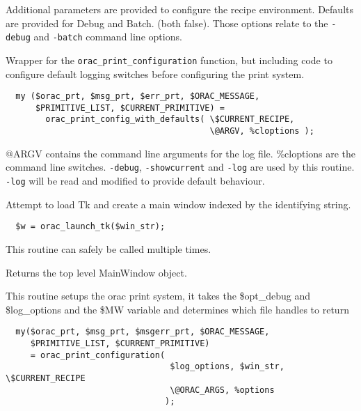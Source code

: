\begin{description}
Additional parameters are provided to configure the recipe
environment. Defaults are provided for Debug and Batch.
(both false). Those options relate to the \texttt{-debug} and \texttt{-batch}
command line options.


\item[{\textbf{orac\_print\_config\_with\_defaults}}] \mbox{}

Wrapper for the \texttt{orac\_print\_configuration} function, but including
code to configure default logging switches before configuring the
print system.

\begin{verbatim}
  my ($orac_prt, $msg_prt, $err_prt, $ORAC_MESSAGE,
      $PRIMITIVE_LIST, $CURRENT_PRIMITIVE) =
        orac_print_config_with_defaults( \$CURRENT_RECIPE,
                                         \@ARGV, %cloptions );
\end{verbatim}


@ARGV contains the command line arguments for the log file. \%cloptions
are the command line switches. \texttt{-debug}, \texttt{-showcurrent} and \texttt{-log}
are used by this routine. \texttt{-log} will be read and modified to provide
default behaviour.


\item[{\textbf{orac\_launch\_tk}}] \mbox{}

Attempt to load Tk and create a main window indexed by the identifying
string.

\begin{verbatim}
  $w = orac_launch_tk($win_str);
\end{verbatim}


This routine can safely be called multiple times.



Returns the top level MainWindow object.


\item[{\textbf{orac\_print\_configuration}}] \mbox{}

This routine setups the orac print system, it takes the \$opt\_debug and
\$log\_options and the \$MW variable and determines which file handles to return

\begin{verbatim}
  my($orac_prt, $msg_prt, $msgerr_prt, $ORAC_MESSAGE,
     $PRIMITIVE_LIST, $CURRENT_PRIMITIVE)
     = orac_print_configuration(
                                 $log_options, $win_str, \$CURRENT_RECIPE
                                 \@ORAC_ARGS, %options
                                );
\end{verbatim}



\end{description}
